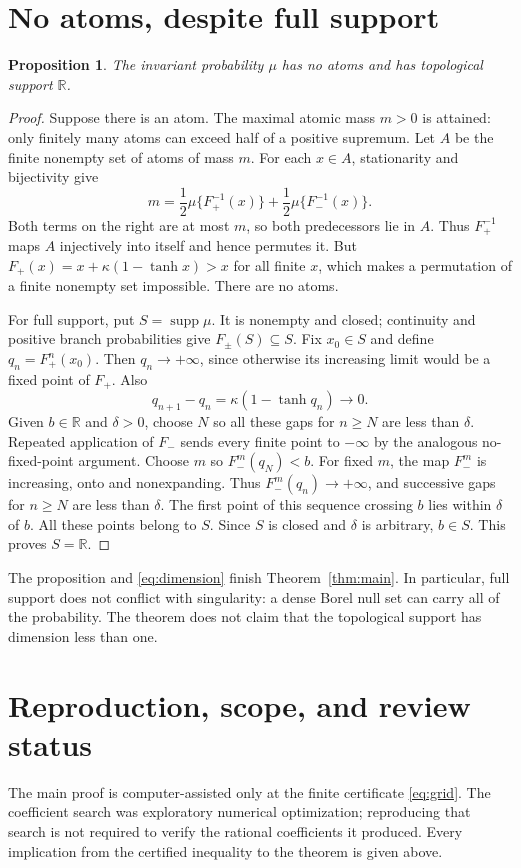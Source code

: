 \documentclass[11pt]{article}
\newtheorem{proposition}[theorem]{Proposition}
\theoremstyle{remark}
\newcommand{\R}{\mathbb R}
\newcommand{\supp}{\operatorname{supp}}
\begin{document}
\section{No atoms, despite full support}
\begin{proposition}\label{prop:properties}
The invariant probability $\mu$ has no atoms and has topological support $\R$.
\end{proposition}
\begin{proof}
Suppose there is an atom. The maximal atomic mass $m>0$ is attained: only finitely many atoms can exceed half of a positive supremum. Let $A$ be the finite nonempty set of atoms of mass $m$. For each $x\in A$, stationarity and bijectivity give
\[
m=\frac12\mu\{F_+^{-1}(x)\}+\frac12\mu\{F_-^{-1}(x)\}.
\]
Both terms on the right are at most $m$, so both predecessors lie in $A$. Thus $F_+^{-1}$ maps $A$ injectively into itself and hence permutes it. But $F_+(x)=x+\kappa(1-\tanh x)>x$ for all finite $x$, which makes a permutation of a finite nonempty set impossible. There are no atoms.

For full support, put $S=\supp\mu$. It is nonempty and closed; continuity and positive branch probabilities give $F_\pm(S)\subseteq S$. Fix $x_0\in S$ and define $q_n=F_+^n(x_0)$. Then $q_n\to+\infty$, since otherwise its increasing limit would be a fixed point of $F_+$. Also
\[
q_{n+1}-q_n=\kappa(1-\tanh q_n)\longrightarrow0.
\]
Given $b\in\R$ and $\delta>0$, choose $N$ so all these gaps for $n\ge N$ are less than $\delta$. Repeated application of $F_-$ sends every finite point to $-\infty$ by the analogous no-fixed-point argument. Choose $m$ so $F_-^m(q_N)<b$. For fixed $m$, the map $F_-^m$ is increasing, onto and nonexpanding. Thus $F_-^m(q_n)\to+\infty$, and successive gaps for $n\ge N$ are less than $\delta$. The first point of this sequence crossing $b$ lies within $\delta$ of $b$. All these points belong to $S$. Since $S$ is closed and $\delta$ is arbitrary, $b\in S$. This proves $S=\R$.
\end{proof}
The proposition and \eqref{eq:dimension} finish Theorem~\ref{thm:main}. In particular, full support does not conflict with singularity: a dense Borel null set can carry all of the probability. The theorem does not claim that the topological support has dimension less than one.

\section{Reproduction, scope, and review status}
The main proof is computer-assisted only at the finite certificate \eqref{eq:grid}. The coefficient search was exploratory numerical optimization; reproducing that search is not required to verify the rational coefficients it produced. Every implication from the certified inequality to the theorem is given above.
\end{document}
